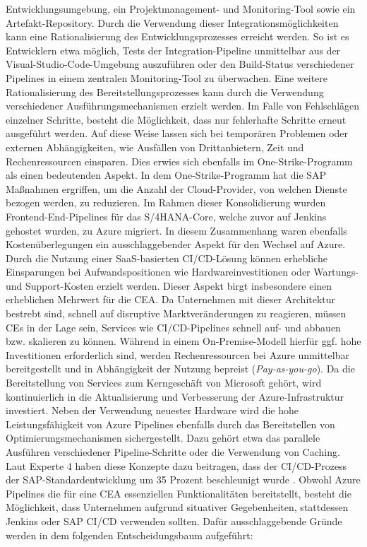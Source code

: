 Entwicklungsumgebung, ein Projektmanagement- und Monitoring-Tool sowie ein Artefakt-Repository. Durch die Verwendung dieser Integrationsmöglichkeiten kann eine Rationalisierung des Entwicklungsprozesses erreicht werden. So ist es Entwicklern etwa möglich, Tests der Integration-Pipeline unmittelbar aus der Visual-Studio-Code-Umgebung auszuführen oder den Build-Status verschiedener Pipelines in einem zentralen Monitoring-Tool zu überwachen. Eine weitere Rationalisierung des Bereitstellungsprozesses kann durch die Verwendung verschiedener Ausführungsmechanismen erzielt werden. Im Falle von Fehlschlägen einzelner Schritte, besteht die Möglichkeit, dass nur fehlerhafte Schritte erneut ausgeführt werden. Auf diese Weise lassen sich bei temporären Problemen oder externen Abhängigkeiten, wie Ausfällen von Drittanbietern, Zeit und Rechenressourcen einsparen. Dies erwies sich ebenfalls im One-Strike-Programm als einen bedeutenden Aspekt. In dem One-Strike-Programm hat die SAP Maßnahmen ergriffen, um die Anzahl der Cloud-Provider, von welchen Dienste bezogen werden, zu reduzieren. Im Rahmen dieser Konsolidierung wurden Frontend-End-Pipelines für das S/4HANA-Core, welche zuvor auf Jenkins gehostet wurden, zu Azure migriert. In diesem Zusammenhang waren ebenfalls Kostenüberlegungen ein ausschlaggebender Aspekt für den Wechsel auf Azure. Durch die Nutzung einer SaaS-basierten CI/CD-Lösung können erhebliche Einsparungen bei Aufwandspositionen wie Hardwareinvestitionen oder Wartungs- und Support-Kosten erzielt werden. Dieser Aspekt birgt insbesondere einen erheblichen Mehrwert für die CEA. Da Unternehmen mit dieser Architektur bestrebt sind, schnell auf disruptive Marktveränderungen zu reagieren, müssen CEs in der Lage sein, Services wie CI/CD-Pipelines schnell auf- und abbauen bzw. skalieren zu können. Während in einem On-Premise-Modell hierfür ggf. hohe Investitionen erforderlich sind, werden Rechenressourcen bei Azure unmittelbar bereitgestellt und in Abhängigkeit der Nutzung bepreist (\textit{Pay-as-you-go}). Da die Bereitstellung von Services zum Kerngeschäft von Microsoft gehört, wird kontinuierlich in die Aktualisierung und Verbesserung der Azure-Infrastruktur investiert. Neben der Verwendung neuester Hardware wird die hohe Leistungsfähigkeit von Azure Pipelines ebenfalls durch das Bereitstellen von Optimierungsmechanismen sichergestellt. Dazu gehört etwa das parallele Ausführen verschiedener Pipeline-Schritte oder die Verwendung von Caching. Laut Experte 4 haben diese Konzepte dazu beitragen, dass der CI/CD-Prozess der SAP-Standardentwicklung um 35 Prozent beschleunigt wurde \cite[Z. 58 ff.]{TestDeveloperSAPHyperspaceAdoption&Onboarding.}. Obwohl Azure Pipelines die für eine CEA essenziellen Funktionalitäten bereitstellt, besteht die Möglichkeit, dass Unternehmen aufgrund situativer Gegebenheiten, stattdessen Jenkins oder SAP CI/CD verwenden sollten. Dafür ausschlaggebende Gründe werden in dem folgenden Entscheidungsbaum aufgeführt:
